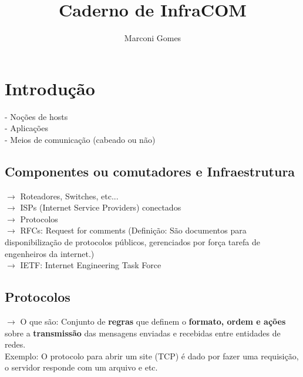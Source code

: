 \documentclass[12pt]{article}
\begin{document}
\nocite{*}

\title{Caderno de InfraCOM}
\author{Marconi Gomes}

\maketitle


\section{Introdução}
    - Noções de hosts
    \\- Aplicações
    \\- Meios de comunicação (cabeado ou não)
    
    \subsection{Componentes ou comutadores e Infraestrutura}
    $\rightarrow$ Roteadores, Switches, etc...
    \\$\rightarrow$ ISPs (Internet Service Providers) conectados
    \\$\rightarrow$ Protocolos
    \\$\rightarrow$ RFCs: Request for comments (Definição: São documentos para disponibilização de protocolos públicos, gerenciados por força tarefa de engenheiros da internet.)
    \\$\rightarrow$ IETF: Internet Engineering Task Force
    
    \subsection{Protocolos}
    $\rightarrow$ O que são: Conjunto de \textbf{regras} que definem o \textbf{formato, ordem e ações} sobre a \textbf{transmissão} das mensagens enviadas e recebidas entre entidades de redes. \quad \quad
    \\Exemplo: O protocolo para abrir um site (TCP) é dado por fazer uma requisição, o servidor responde com um arquivo e etc.
\end{document}
